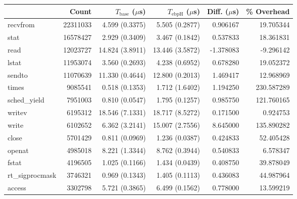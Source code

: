\begin{tabular}{>{\ttfamily}lrrrrr}
\toprule
\multicolumn{1}{l}{System Call} &     Count & $T_\text{base}$ ($\mu$s) & $T_\text{ebpH}$ ($\mu$s) &  Diff. ($\mu$s) &  \% Overhead \\
\midrule
                       recvfrom &  22311033 &           4.599 (0.3375) &           5.505 (0.2877) &        0.906167 &    19.705344 \\
                           stat &  16578427 &           2.929 (0.3409) &           3.467 (0.1842) &        0.537833 &    18.361831 \\
                           read &  12023727 &          14.824 (3.8911) &          13.446 (3.5872) &       -1.378083 &    -9.296142 \\
                          lstat &  11953074 &           3.560 (0.2693) &           4.238 (0.6952) &        0.678280 &    19.052372 \\
                         sendto &  11070639 &          11.330 (0.4644) &          12.800 (0.2013) &        1.469417 &    12.968969 \\
                          times &   9085541 &           0.518 (0.1353) &           1.712 (1.6402) &        1.194250 &   230.587289 \\
                   sched\_yield &   7951003 &           0.810 (0.0547) &           1.795 (0.1257) &        0.985750 &   121.760165 \\
                         writev &   6195312 &          18.546 (7.1331) &          18.717 (8.5272) &        0.171500 &     0.924753 \\
                          write &   6102652 &           6.362 (3.2141) &          15.007 (2.7556) &        8.645000 &   135.890282 \\
                          close &   5701429 &           0.811 (0.0969) &           1.236 (0.0387) &        0.424833 &    52.405428 \\
                         openat &   4985018 &           8.221 (1.3344) &           8.762 (0.3944) &        0.540833 &     6.578347 \\
                          fstat &   4196505 &           1.025 (0.1166) &           1.434 (0.0439) &        0.408750 &    39.878049 \\
                rt\_sigprocmask &   3746321 &           0.969 (0.1343) &           1.405 (0.1113) &        0.436083 &    44.987964 \\
                         access &   3302798 &           5.721 (0.3865) &           6.499 (0.1562) &        0.778000 &    13.599219 \\

\end{tabular}
